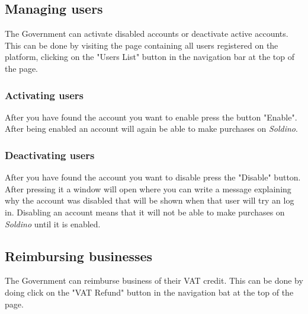 	\subsection{Managing users}
	The Government can activate disabled accounts or deactivate active accounts.
	This can be done by visiting the page containing all users registered on the
	platform, clicking on the "Users List" button in the navigation bar at the top of the page.
%	
		\subsubsection{Activating users}
		After you have found the account you want to enable press the button 
		"Enable". After being enabled an account will again be able to make 
		purchases on \textit{Soldino}.
%		
		\subsubsection{Deactivating users}
		After you have found the account you want to disable press the 
		"Disable" button. After pressing it a window will open where you can 
		write a	message explaining why the account was disabled that will be 
		shown when that user will try an log in. Disabling an account 
		means that it will not be able to make purchases on \textit{Soldino} 
		until it is enabled.
%		
	\subsection{Reimbursing businesses}
	The Government can reimburse business of their VAT credit. This can be done 
	by doing click on the "VAT Refund" button in the navigation bat at the top of the page.
%	